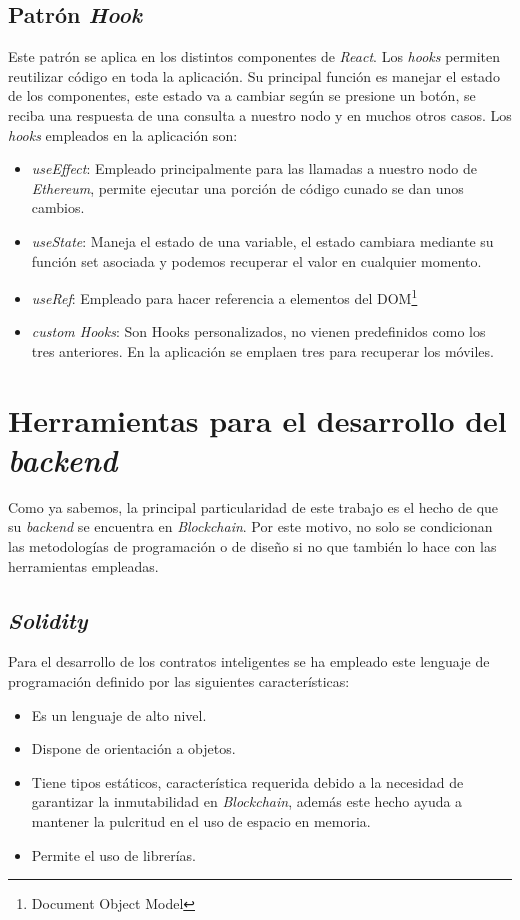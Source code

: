 \subsection{Patrón \textit{Hook}}
Este patrón se aplica en los distintos componentes de \textit{React}. Los \textit{hooks}\cite{patternsHooksPattern} permiten reutilizar código en toda la aplicación. Su principal función es manejar el estado de los componentes, este estado va a cambiar según se presione un botón, se reciba una respuesta de una consulta a nuestro nodo y en muchos otros casos. Los \textit{hooks} empleados en la aplicación son:
\begin{itemize}
    \item  \textit{useEffect}: Empleado principalmente para las llamadas a nuestro nodo de \textit{Ethereum}, permite ejecutar una porción de código cunado se dan unos cambios.
    \item  \textit{useState}: Maneja el estado de una variable, el estado cambiara mediante su función set asociada y podemos recuperar el valor en cualquier momento.
    \item  \textit{useRef}: Empleado para hacer referencia a elementos del DOM\footnote{Document Object Model} 
    \item  \textit{custom Hooks}: Son Hooks personalizados, no vienen predefinidos como los tres anteriores. En la aplicación se emplaen tres para recuperar los móviles.
\end{itemize}

\section{Herramientas para el desarrollo del \textit{backend}}

Como ya sabemos, la principal particularidad de este trabajo es el hecho de que su \textit{backend} se encuentra en \textit{Blockchain}. Por este motivo, no solo se condicionan las metodologías de programación o de diseño si no que también lo hace con las herramientas empleadas.

\subsection{\textit{Solidity}}
Para el desarrollo de los contratos inteligentes se ha empleado este lenguaje \cite{soliditylangSolidityProgramming} de programación definido por las siguientes características:
\begin{itemize}
    \item Es un lenguaje de alto nivel.
    \item Dispone de orientación a objetos.
    \item Tiene tipos estáticos, característica requerida debido a la necesidad de garantizar la inmutabilidad en \textit{Blockchain}, además este hecho ayuda a mantener la  pulcritud en el uso de espacio en memoria.
    \item Permite el uso de librerías.
\end{itemize}

